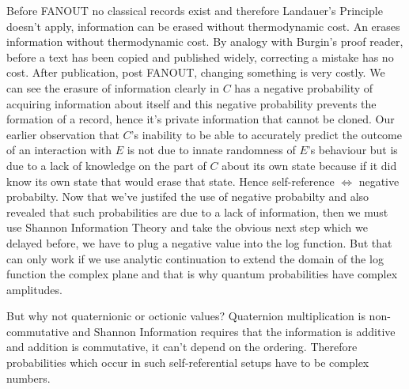 \documentclass{article}
\begin{document}
Before FANOUT no classical records exist and therefore Landauer's Principle doesn't apply, information can be erased without thermodynamic cost. An  erases information without thermodynamic cost. By analogy with Burgin's proof reader, before a text has been copied and published widely, correcting a mistake has no cost. After publication, post FANOUT, changing something is very costly. We can see the erasure of information clearly in  $C$ has a negative probability of acquiring information about itself and this negative probability prevents the formation of a record, hence it's private information that cannot be cloned. Our earlier observation that $C$'s inability to be able to accurately predict the outcome of an interaction with $E$ is not due to innate randomness of $E$'s behaviour but is due to a lack of knowledge on the part of $C$ about its own state because if it did know its own state that would erase that state. Hence self-reference $\iff$ negative probabilty. 
\label{sec:complex-amplitudes}
Now that we've justifed the use of negative probabilty and also revealed that such probabilities are due to a lack of information, then we must use Shannon Information Theory and take the obvious next step which we delayed before, we have to plug a negative value into the log function. But that can only work if we use analytic continuation to extend the domain of the log function the complex plane and that is why quantum probabilities have complex amplitudes. 

But why not quaternionic or octionic values? Quaternion multiplication is non-commutative and Shannon Information requires that the information is additive and addition is commutative, it can't depend on the ordering.
Therefore probabilities which occur in such self-referential setups have to be complex numbers. 
\end{document}
